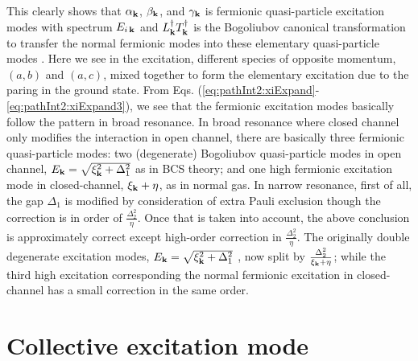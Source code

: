 This clearly shows that $\alpha_{\mathbf{k}}$, $\beta_{\mathbf{k}}$, and $\gamma_{\mathbf{k}}$ is fermionic quasi-particle excitation modes with spectrum $E_{i\,\mathbf{k}}$ and   $L^{\dagger}_{\mathbf{k}}T^{\dagger}_{\mathbf{k}}$ is  the Bogoliubov canonical transformation to transfer the normal fermionic modes into these elementary quasi-particle modes .  Here we see in the excitation, different species of opposite momentum, $(a,b)$ and $(a,c)$, mixed together to form the elementary excitation due to the paring in the ground state.  
  From Eqs. (\ref{eq:pathInt2:xiExpand}-\ref{eq:pathInt2:xiExpand3}), we see that the fermionic excitation modes basically follow the pattern in broad resonance.  In broad resonance where closed channel only modifies the interaction in open channel,  there are basically three fermionic quasi-particle modes: two (degenerate) Bogoliubov quasi-particle modes  in open channel, $E_{\mathbf{k}}=\sqrt{\xi^{2}_{\mathbf{k}}+\Delta_{1}^{2}}$ as in BCS theory; and one high fermionic excitation mode in closed-channel, $\xi_{\mathbf{k}}+\eta$, as in normal gas.  In narrow resonance, first of all, the gap $\Delta_{1}$ is modified  by consideration of extra Pauli exclusion though the correction is in order of $\frac{\Delta_2^2}{\eta}$.  Once that is taken into account, the above conclusion is approximately correct except high-order correction in $\frac{\Delta_{2}^{2}}{\eta}$.   The originally double degenerate excitation modes, $E_{\mathbf{k}}=\sqrt{\xi^{2}_{\mathbf{k}}+\Delta_{1}^{2}}$ , now split by $\frac{\Delta_{2}^{2}}{\xi_{\mathbf{k}}+\eta}$; while the third high excitation corresponding the normal fermionic excitation in closed-channel has a small correction in the same order. 

\section{Collective excitation mode}
%

